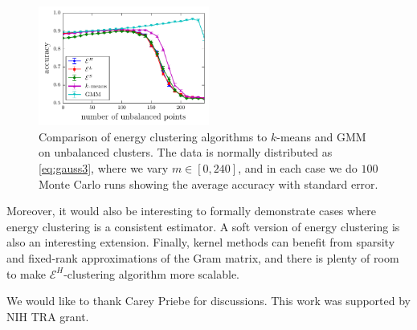 \documentclass[aps,preprint,nofootinbib,floatfix]{revtex4-1}
\begin{document}
\begin{figure}
\includegraphics[width=0.5\textwidth]{normal_unbalanced.pdf}\vspace{-1em}
\caption{
\label{fig:unbalanced}
Comparison of energy clustering algorithms to $k$-means and GMM on
unbalanced clusters. The data is normally 
distributed as \eqref{eq:gauss3}, where
we vary $m \in [0, 240]$, and in each case we do $100$ Monte Carlo runs
showing the average accuracy with standard error.
}
\end{figure}

Moreover, it would also be interesting to formally 
demonstrate cases where energy clustering is a 
consistent estimator. A soft version of energy clustering is also an
interesting extension.
Finally, kernel methods can benefit from sparsity and
fixed-rank approximations of the Gram matrix, and there is plenty
of room to make $\mathcal{E}^H$-clustering algorithm more scalable.




\begin{acknowledgements}
We would like to thank Carey Priebe for discussions.
This work was supported by NIH TRA grant.
\end{acknowledgements}



\end{document}
